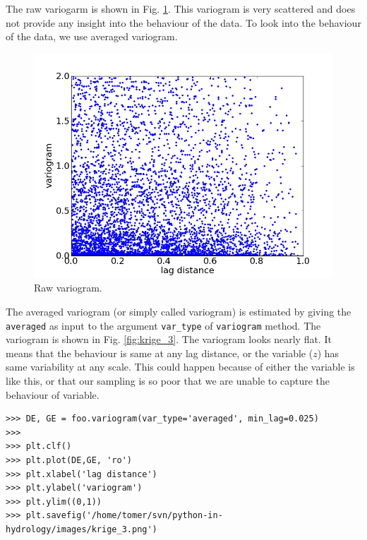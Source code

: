 \documentclass[10pt]{book}
\begin{document}
{The raw variogarm is shown in Fig. \ref{fig:krige_2}. This variogram is very scattered and does not provide any insight into the behaviour of the data. To look into the behaviour of the data, we use averaged variogram. 

\beforefig
\begin{figure}[h!]
  \centering
    \includegraphics[scale=0.5]{images/krige_2.png}
  \caption{Raw variogram.}
   \label{fig:krige_2}
\end{figure}
\afterfig

The averaged variogram (or simply called variogram) is estimated by giving the \verb"averaged" as input to the argument \verb"var_type" of \verb"variogram" method. The variogram is shown in Fig. \ref{fig:krige_3}. The variogram looks nearly flat. It means that the behaviour is same at any lag distance, or the variable ($z$) has same variability at any scale. This could happen because of either the variable is like this, or that our sampling is so poor that we are unable to capture the behaviour of variable. 

\beforeverb \begin{verbatim}
>>> DE, GE = foo.variogram(var_type='averaged', min_lag=0.025)
>>> 
>>> plt.clf()
>>> plt.plot(DE,GE, 'ro')
>>> plt.xlabel('lag distance')
>>> plt.ylabel('variogram')
>>> plt.ylim((0,1))
>>> plt.savefig('/home/tomer/svn/python-in-hydrology/images/krige_3.png')
\end{verbatim} \afterverb

}
\end{document}
